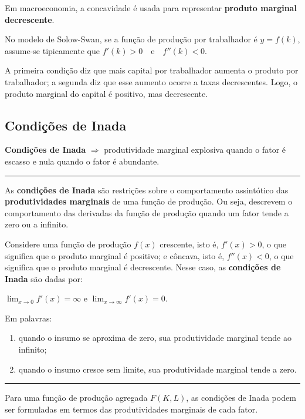\documentclass[12pt]{article}
\begin{document}
Em macroeconomia, a concavidade é usada para representar \textbf{produto marginal decrescente}. 

No modelo de Solow-Swan, se a função de produção por trabalhador é $y=f(k)$, assume-se tipicamente que
$f'(k) > 0 \quad \text{e} \quad f''(k) < 0$.

A primeira condição diz que mais capital por trabalhador aumenta o produto por trabalhador; a segunda diz que esse aumento ocorre a taxas decrescentes. Logo, o produto marginal do capital é positivo, mas decrescente.

\newpage
\subsection{Condições de Inada}

\textbf{Condições de Inada} $\Rightarrow$ produtividade marginal explosiva quando o fator é escasso e nula quando o fator é abundante.

\medskip
\noindent\rule{\textwidth}{0.4pt}
\medskip

As \textbf{condições de Inada} são restrições sobre o comportamento assintótico das \textbf{produtividades marginais} de uma função de produção. Ou seja, descrevem o comportamento das derivadas da função de produção quando um fator tende a zero ou a infinito.

Considere uma função de produção $f(x)$ crescente, isto é, $f'(x)>0$, o que significa que o produto marginal é positivo; e côncava, isto é, $f''(x)<0$, o que significa que o produto marginal é decrescente. Nesse caso, as \textbf{condições de Inada} são dadas por:

$\lim_{x \to 0} f'(x)=\infty$
\quad e \quad
$\lim_{x \to \infty} f'(x)=0$.

Em palavras:

\begin{enumerate}
    \item quando o insumo se aproxima de zero, sua produtividade marginal tende ao infinito;
    \item quando o insumo cresce sem limite, sua produtividade marginal tende a zero.
\end{enumerate}

\medskip
\noindent\rule{\textwidth}{0.4pt}
\medskip

Para uma função de produção agregada $F(K,L)$, as condições de Inada podem ser formuladas em termos das produtividades marginais de cada fator.
\end{document}
